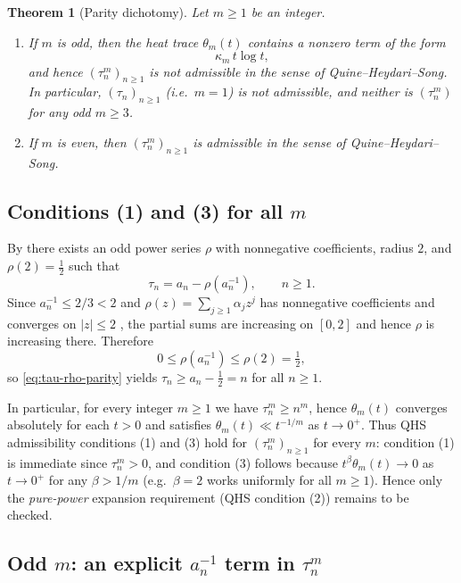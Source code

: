 \documentclass[11pt,letterpaper]{amsart}
\numberwithin{equation}{section}
\newtheorem{theorem}{Theorem}[section]
\theoremstyle{definition}
\begin{document}
\begin{theorem}[Parity dichotomy]\label{thm:parity-dichotomy}
Let $m\ge1$ be an integer.
\begin{enumerate}[label=\textup{(\alph*)},leftmargin=2.5em]
\item If $m$ is \emph{odd}, then the heat trace $\theta_m(t)$ contains a \emph{nonzero} term of the form
\[
\kappa_m\,t\log t,
\]
and hence $(\tau_n^m)_{n\ge1}$ is \emph{not} admissible in the sense of Quine--Heydari--Song.
In particular, $(\tau_n)_{n\ge1}$ (i.e.\ $m=1$) is not admissible, and neither is $(\tau_n^m)$ for any odd $m\ge3$.
\item If $m$ is \emph{even}, then $(\tau_n^m)_{n\ge1}$ is admissible in the sense of Quine--Heydari--Song.
\end{enumerate}
\end{theorem}

\subsection{Conditions (1) and (3) for all $m$}

By \cite[Theorem~1.2]{BOCRS} there exists an odd power series $\rho$ with nonnegative coefficients,
radius $2$, and $\rho(2)=\tfrac12$ such that
\begin{equation}\label{eq:tau-rho-parity}
\tau_n=a_n-\rho(a_n^{-1}),\qquad n\ge1.
\end{equation}
Since $a_n^{-1}\le 2/3<2$ and $\rho(z)=\sum_{j\ge1}\alpha_j z^j$ has nonnegative coefficients and
converges on $|z|\le 2$ \cite[Thm.~6.1]{BOCRS}, the partial sums are increasing on $[0,2]$
and hence $\rho$ is increasing there.  Therefore
\[
0\le \rho(a_n^{-1})\le \rho(2)=\tfrac12,
\]
so \eqref{eq:tau-rho-parity} yields $\tau_n\ge a_n-\tfrac12=n$ for all $n\ge1$.

In particular, for every integer $m\ge1$ we have $\tau_n^m\ge n^m$, hence $\theta_m(t)$ converges
absolutely for each $t>0$ and satisfies $\theta_m(t)\ll t^{-1/m}$ as $t\to0^+$.
Thus QHS admissibility conditions \textup{(1)} and \textup{(3)} hold for $(\tau_n^m)_{n\ge1}$ for every $m$:
condition \textup{(1)} is immediate since $\tau_n^m>0$, and condition \textup{(3)} follows because
$t^\beta\theta_m(t)\to0$ as $t\to0^+$ for any $\beta>1/m$ (e.g.\ $\beta=2$ works uniformly for all $m\ge1$).
Hence only the \emph{pure-power} expansion requirement (QHS condition \textup{(2)}) remains to be checked.



\subsection{Odd $m$: an explicit $a_n^{-1}$ term in $\tau_n^m$}
\end{document}
